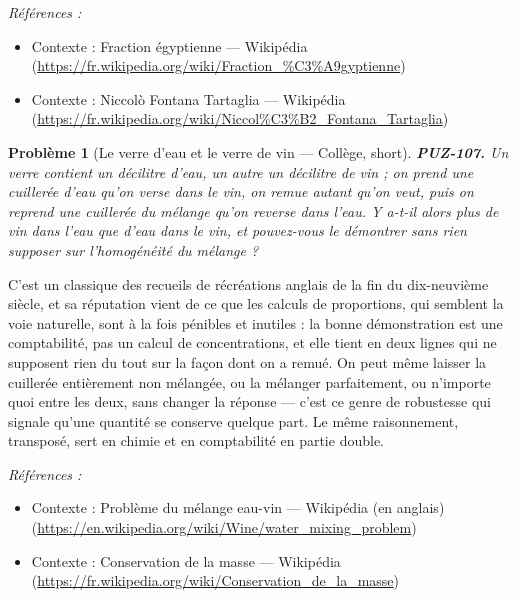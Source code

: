\documentclass[11pt]{article}
\newtheorem{problem}{Problème}
\newenvironment{refs}{\par\small\noindent\emph{Références :}\begin{itemize}\setlength\itemsep{0pt}}{\end{itemize}\normalsize}
\begin{document}
\begin{refs}
\item Contexte : Fraction égyptienne --- Wikipédia (\url{https://fr.wikipedia.org/wiki/Fraction_%C3%A9gyptienne})
\item Contexte : Niccolò Fontana Tartaglia --- Wikipédia (\url{https://fr.wikipedia.org/wiki/Niccol%C3%B2_Fontana_Tartaglia})
\end{refs}

\bigskip

\begin{problem}[{Le verre d'eau et le verre de vin --- Collège, short}]
\textbf{PUZ-107.} Un verre contient un décilitre d'eau, un autre un
décilitre de vin ; on prend une cuillerée d'eau qu'on verse dans le vin, on remue autant qu'on
veut, puis on reprend une cuillerée du mélange qu'on reverse dans l'eau. Y a-t-il alors plus
de vin dans l'eau que d'eau dans le vin, et pouvez-vous le démontrer sans rien supposer sur
l'homogénéité du mélange ?
\end{problem}

\noindent C'est un classique des recueils de récréations anglais de la fin du dix-neuvième
siècle, et sa réputation vient de ce que les calculs de proportions, qui semblent la voie
naturelle, sont à la fois pénibles et inutiles : la bonne démonstration est une comptabilité,
pas un calcul de concentrations, et elle tient en deux lignes qui ne supposent rien du tout
sur la façon dont on a remué. On peut même laisser la cuillerée entièrement non mélangée, ou
la mélanger parfaitement, ou n'importe quoi entre les deux, sans changer la réponse --- c'est
ce genre de robustesse qui signale qu'une quantité se conserve quelque part. Le même
raisonnement, transposé, sert en chimie et en comptabilité en partie double.

\begin{refs}
\item Contexte : Problème du mélange eau-vin --- Wikipédia (en anglais) (\url{https://en.wikipedia.org/wiki/Wine/water_mixing_problem})
\item Contexte : Conservation de la masse --- Wikipédia (\url{https://fr.wikipedia.org/wiki/Conservation_de_la_masse})
\end{refs}

\bigskip
\end{document}
